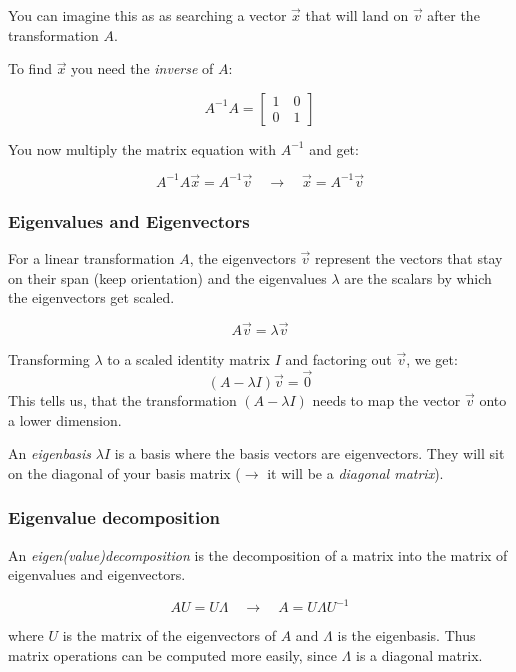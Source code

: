 \documentclass[
]{book}
\begin{document}
You can imagine this as as searching a vector \(\vec{x}\) that will land
on \(\vec{v}\) after the transformation \(A\).

To find \(\vec{x}\) you need the \emph{inverse} of \(A\):

\[
A^{-1}A = \begin{bmatrix} 1 \quad 0 \\ 0 \quad 1 \end{bmatrix}
\]

You now multiply the matrix equation with \(A^{-1}\) and get:

\[
A^{-1} A \vec{x} = A^{-1} \vec{v}
\quad \rightarrow \quad
\vec{x} = A^{-1} \vec{v}
\]

\hypertarget{eigenvalues-and-eigenvectors}{%
\subsubsection{Eigenvalues and Eigenvectors}\label{eigenvalues-and-eigenvectors}}

For a linear transformation \(A\), the eigenvectors \(\vec{v}\) represent
the vectors that stay on their span (keep orientation) and the
eigenvalues \(\lambda\) are the scalars by which the eigenvectors get
scaled.

\[
A \vec{v} = \lambda \vec{v}
\]

Transforming \(\lambda\) to a scaled identity matrix \(I\) and factoring out
\(\vec{v}\), we get: \[
(A - \lambda I) \vec{v} =  \vec{0}
\] This tells us, that the transformation \((A - \lambda I)\) needs to map
the vector \(\vec{v}\) onto a lower dimension.

An \emph{eigenbasis} \(\lambda I\) is a basis where the basis vectors are
eigenvectors. They will sit on the diagonal of your basis matrix
(\(\rightarrow\) it will be a \emph{diagonal matrix}).

\hypertarget{EV_Dec}{%
\subsubsection{Eigenvalue decomposition}\label{EV_Dec}}

An \emph{eigen(value)decomposition} is the decomposition of a matrix into the
matrix of eigenvalues and eigenvectors.

\[
AU = U \Lambda  \quad \rightarrow \quad A = U \Lambda U^{-1}
\]

where \(U\) is the matrix of the eigenvectors of \(A\) and \(\Lambda\) is the
eigenbasis. Thus matrix operations can be computed more easily, since
\(\Lambda\) is a diagonal matrix.
\end{document}
